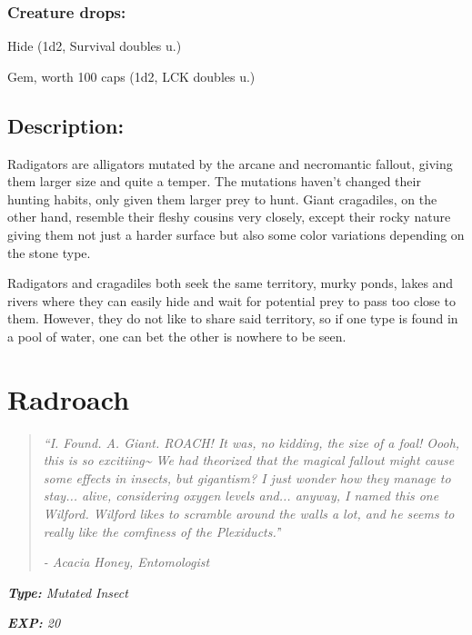\documentclass[11pt,a4paper,twocolumn]{book}
\begin{document}
	\subsubsection*{Creature drops:}
	\begin{compactitem}
		\item Hide (1d2, Survival doubles u.)
		\item Gem, worth 100 caps (1d2, LCK doubles u.)
	\end{compactitem}
	
	\subsection*{Description:}
	Radigators are alligators mutated by the arcane and necromantic fallout, giving them larger size and quite a temper. The mutations haven't changed their hunting habits, only given them larger prey to hunt. Giant cragadiles, on the other hand, resemble their fleshy cousins very closely, except their rocky nature giving them not just a harder surface but also some color variations depending on the stone type.
	
	Radigators and cragadiles both seek the same territory, murky ponds, lakes and rivers where they can easily hide and wait for potential prey to pass too close to them. However, they do not like to share said territory, so if one type is found in a pool of water, one can bet the other is nowhere to be seen. 
	
	\clearpage
	
	\section*{Radroach}
	\begin{quote}
		\emph{``I. Found. A. Giant. ROACH! It was, no kidding, the size of a foal! Oooh, this is so excitiing\~{} We had theorized that the magical fallout might cause some effects in insects, but gigantism? I just wonder how they manage to stay... alive, considering oxygen levels and... anyway, I named this one Wilford. Wilford likes to scramble around the walls a lot, and he seems to really like the comfiness of the Plexiducts.'}'
		
		\emph{-	Acacia Honey, Entomologist}
	\end{quote}
	
	\emph{\textbf{Type:} Mutated Insect}
	
	\emph{\textbf{EXP:} 20}
	
\end{document}

